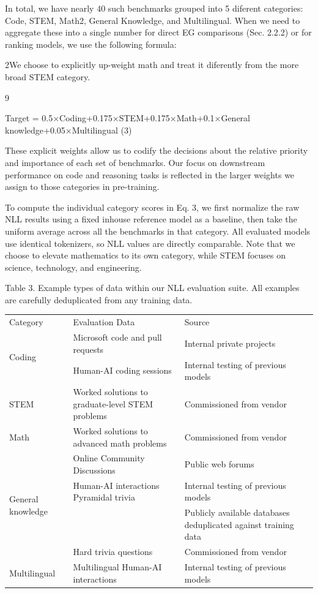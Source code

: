 \documentclass[
  10
]{article}
\newcounter{none} %
\begin{document}
In total, we have nearly 40 such benchmarks grouped into 5 diferent
categories: Code, STEM, Math2, General Knowledge, and Multilingual. When
we need to aggregate these into a single number for direct EG
comparisons (Sec. 2.2.2) or for ranking models, we use the following
formula:

2We choose to explicitly up-weight math and treat it diferently from the
more broad STEM category.

9

Target = 0.5×Coding+0.175×STEM+0.175×Math+0.1×General
knowledge+0.05×Multilingual (3)

These explicit weights allow us to codify the decisions about the
relative priority and importance of each set of benchmarks. Our focus on
downstream performance on code and reasoning tasks is reflected in the
larger weights we assign to those categories in pre-training.

To compute the individual category scores in Eq. 3, we first normalize
the raw NLL results using a fixed inhouse reference model as a baseline,
then take the uniform average across all the benchmarks in that
category. All evaluated models use identical tokenizers, so NLL values
are directly comparable. Note that we choose to elevate mathematics to
its own category, while STEM focuses on science, technology, and
engineering.

Table 3. Example types of data within our NLL evaluation suite. All
examples are carefully deduplicated from any training data.

{\def\LTcaptype{none} %
\begin{longtable}[]{@{}lll@{}}
\toprule\noalign{}
\endhead
\bottomrule\noalign{}
\endlastfoot
Category & Evaluation Data & Source \\
\multirow{2}{*}{Coding} & Microsoft code and pull requests & Internal
private projects \\
& Human-AI coding sessions & Internal testing of previous models \\
STEM & Worked solutions to graduate-level STEM problems & Commissioned
from vendor \\
Math & Worked solutions to advanced math problems & Commissioned from
vendor \\
\multirow{4}{*}{General knowledge} & Online Community Discussions &
Public web forums \\
& Human-AI interactions Pyramidal trivia & Internal testing of previous
models \\
& & Publicly available databases deduplicated against training data \\
& Hard trivia questions & Commissioned from vendor \\
Multilingual & Multilingual Human-AI interactions & Internal testing of
previous models \\
\end{longtable}
}
\end{document}
